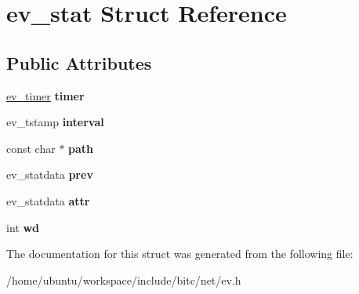 \hypertarget{structev__stat}{\section{ev\-\_\-stat Struct Reference}
\label{structev__stat}
}
\subsection*{Public Attributes}
\begin{DoxyCompactItemize}
\item 
\hypertarget{structev__stat_acec38fb069a9dd9c8f57ea1ca0c70076}{\hyperlink{structev__timer}{ev\-\_\-timer} {\bfseries timer}}\label{structev__stat_acec38fb069a9dd9c8f57ea1ca0c70076}

\item 
\hypertarget{structev__stat_a41db8a24ee882bd042baef97ca153def}{ev\-\_\-tstamp {\bfseries interval}}\label{structev__stat_a41db8a24ee882bd042baef97ca153def}

\item 
\hypertarget{structev__stat_a90d741ec1bba36e053b47d187b8d377e}{const char $\ast$ {\bfseries path}}\label{structev__stat_a90d741ec1bba36e053b47d187b8d377e}

\item 
\hypertarget{structev__stat_a1c5c01c31a95d2062385993ce0a931bf}{ev\-\_\-statdata {\bfseries prev}}\label{structev__stat_a1c5c01c31a95d2062385993ce0a931bf}

\item 
\hypertarget{structev__stat_a7988df9156ed36966c979ed78e576350}{ev\-\_\-statdata {\bfseries attr}}\label{structev__stat_a7988df9156ed36966c979ed78e576350}

\item 
\hypertarget{structev__stat_ad0c919954f8bc21de322381f0821a06f}{int {\bfseries wd}}\label{structev__stat_ad0c919954f8bc21de322381f0821a06f}

\end{DoxyCompactItemize}


The documentation for this struct was generated from the following file\-:\begin{DoxyCompactItemize}
\item 
/home/ubuntu/workspace/include/bitc/net/ev.\-h\end{DoxyCompactItemize}
